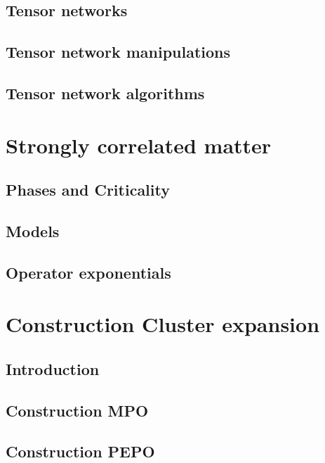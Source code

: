 \documentclass{book}
\newcounter{a}
\newcounter{b}
\begin{document}
\section{Tensor networks}



\section{Tensor network manipulations}\label{sec:mpomath}


\section{Tensor network algorithms}


\chapter{Strongly correlated matter}

\section{Phases and Criticality} \label{sec:PhasesAndCrit}


\section{Models}


\section{Operator exponentials}


\chapter{Construction Cluster expansion}

\section{Introduction}


\section{Construction MPO}


\section{Construction PEPO}

\end{document}
